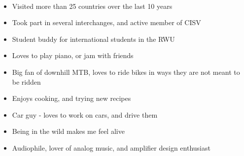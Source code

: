 \documentclass[10pt,a4paper,ragged2e,withhyper]{altacv}
\begin{document}
\begin{paracol}{2}

\divider\smallskip


\divider\smallskip

\\

\smallskip


\divider

\divider

\divider


\medskip



\newpage


\begin{itemize}
\item Visited more than 25 countries over the last 10 years
\item Took part in several interchanges, and active member of CISV
\item Student buddy for international students in the RWU
\end{itemize}

\divider

\begin{itemize}
  \item Loves to play piano, or jam with friends
  \item Big fan of downhill MTB, loves to ride bikes in ways they are not meant to be ridden
  \item Enjoys cooking, and trying new recipes  
  \item Car guy - loves to work on cars, and drive them
  \item Being in the wild makes me feel alive
  \item Audiophile, lover of analog music, and amplifier design enthusiast
\end{itemize}


\end{paracol}
\end{document}
